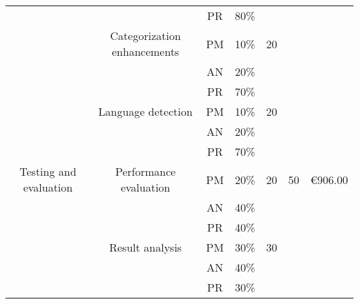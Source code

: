 \begin{table}[p]
\begin{center}
{\begin{tabular}{|c|l|c|c|l|l|l|}
\multicolumn{ 1}{|c|}{} & \multicolumn{ 1}{l|}{} & PR & 80\% & \multicolumn{ 1}{l|}{} & \multicolumn{ 1}{l|}{} & \multicolumn{ 1}{l|}{} \\ \cline{ 2- 5}
\multicolumn{ 1}{|c|}{} & \multicolumn{ 1}{c|}{Categorization enhancements} & PM & 10\% & \multicolumn{ 1}{c|}{20} & \multicolumn{ 1}{l|}{} & \multicolumn{ 1}{l|}{} \\ \cline{ 3- 4}
\multicolumn{ 1}{|c|}{} & \multicolumn{ 1}{l|}{} & AN & 20\% & \multicolumn{ 1}{l|}{} & \multicolumn{ 1}{l|}{} & \multicolumn{ 1}{l|}{} \\ \cline{ 3- 4}
\multicolumn{ 1}{|c|}{} & \multicolumn{ 1}{l|}{} & PR & 70\% & \multicolumn{ 1}{l|}{} & \multicolumn{ 1}{l|}{} & \multicolumn{ 1}{l|}{} \\ \cline{ 2- 5}
\multicolumn{ 1}{|c|}{} & \multicolumn{ 1}{c|}{Language detection} & PM & 10\% & \multicolumn{ 1}{c|}{20} & \multicolumn{ 1}{l|}{} & \multicolumn{ 1}{l|}{} \\ \cline{ 3- 4}
\multicolumn{ 1}{|c|}{} & \multicolumn{ 1}{l|}{} & AN & 20\% & \multicolumn{ 1}{l|}{} & \multicolumn{ 1}{l|}{} & \multicolumn{ 1}{l|}{} \\ \cline{ 3- 4}
\multicolumn{ 1}{|c|}{} & \multicolumn{ 1}{l|}{} & PR & 70\% & \multicolumn{ 1}{l|}{} & \multicolumn{ 1}{l|}{} & \multicolumn{ 1}{l|}{} \\ \hline
\multicolumn{ 1}{|c|}{Testing and evaluation} & \multicolumn{ 1}{c|}{Performance evaluation} & PM & 20\% & \multicolumn{ 1}{c|}{20} & \multicolumn{ 1}{c|}{50} & \multicolumn{ 1}{c|}{\textgreek{\euro}906.00} \\ \cline{ 3- 4}
\multicolumn{ 1}{|c|}{} & \multicolumn{ 1}{l|}{} & AN & 40\% & \multicolumn{ 1}{l|}{} & \multicolumn{ 1}{l|}{} & \multicolumn{ 1}{l|}{} \\ \cline{ 3- 4}
\multicolumn{ 1}{|c|}{} & \multicolumn{ 1}{l|}{} & PR & 40\% & \multicolumn{ 1}{l|}{} & \multicolumn{ 1}{l|}{} & \multicolumn{ 1}{l|}{} \\ \cline{ 2- 5}
\multicolumn{ 1}{|c|}{} & \multicolumn{ 1}{c|}{Result analysis} & PM & 30\% & \multicolumn{ 1}{c|}{30} & \multicolumn{ 1}{l|}{} & \multicolumn{ 1}{l|}{} \\ \cline{ 3- 4}
\multicolumn{ 1}{|c|}{} & \multicolumn{ 1}{l|}{} & AN & 40\% & \multicolumn{ 1}{l|}{} & \multicolumn{ 1}{l|}{} & \multicolumn{ 1}{l|}{} \\ \cline{ 3- 4}
\multicolumn{ 1}{|c|}{} & \multicolumn{ 1}{l|}{} & PR & 30\% & \multicolumn{ 1}{l|}{} & \multicolumn{ 1}{l|}{} & \multicolumn{ 1}{l|}{} \\ \hline

\end{tabular}}
\end{center}
\end{table}

